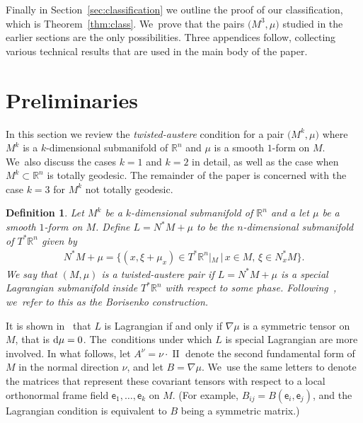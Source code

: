 \documentclass[pdftex]{sigma}
\def\R{\mathbb{R}}
\def\ve{\mathsf{e}}
\def\II{\operatorname{II}} %
\newtheorem{Definition}[Theorem]{Definition}
\numberwithin{equation}{section}
\begin{document}
Finally in Section~\ref{sec:classification} we outline the proof of our classification, which is Theorem~\ref{thm:class}. We~prove that the pairs $\big(M^3, \mu\big)$ studied in the earlier sections are the only possibilities. Three appendices follow, collecting various technical results that are used in the main body of the paper.

\section{Preliminaries} \label{sec:preliminaries}

In this section we review the \emph{twisted-austere} condition for a pair $\big(M^k, \mu\big)$ where $M^k$ is a $k$-dimensional submanifold of $\R^n$ and $\mu$ is a smooth $1$-form on $M$. We~also discuss the cases $k=1$ and $k=2$ in detail, as well as the case when $M^k \subset \R^n$ is totally geodesic. The remainder of the paper is concerned with the case $k=3$ for $M^k$ not totally geodesic.

\begin{Definition} %
Let $M^k$ be a $k$-dimensional submanifold of $\R^n$ and a let $\mu$ be a smooth $1$-form on $M$. Define $L = N^* M + \mu$ to be the $n$-dimensional submanifold of $T^* \R^n$ given by
\begin{gather} \label{eq:twisted-austere}
N^* M + \mu = \big\{(x, \xi + \mu_x) \in T^* \R^n|_M \,|\, x \in M,\, \xi \in N^*_x M \big\}.
\end{gather}
We say that $(M,\mu)$ is a \emph{twisted-austere pair} if $L = N^*M+ \mu$ is a special Lagrangian submanifold inside $T^* \R^n$ with respect to some phase. Following~\cite{KL}, we~refer to this as the \emph{Borisenko construction}.
\end{Definition}

It is shown in~\cite{KL} that $L$ is Lagrangian if and only if $\nabla \mu$ is a symmetric tensor on $M$, that is ${\rm d} \mu = 0$. The~conditions under which $L$ is special Lagrangian are more involved. In what follows, let $A^\nu = \nu \cdot \II$ denote the second fundamental form of $M$ in the normal direction $\nu$, and let $B = \nabla \mu$. We~use the same letters to denote the matrices that represent these covariant tensors with respect to a local orthonormal frame field $\ve_1, \dots, \ve_k$ on $M$. (For example, $B_{ij} = B(\ve_i, \ve_j)$, and the Lagrangian condition
is equivalent to $B$ being a symmetric matrix.)
\end{document}
